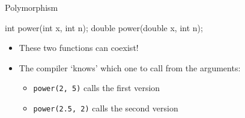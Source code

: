\begin{frame}[fragile]{Polymorphism}
    \begin{cpp}
        int power(int x, int n);
        double power(double x, int n);
    \end{cpp}
    \vspace{-1em}
    \begin{itemize}
        \item These two functions can coexist!
        \item The compiler `knows' which one to call from the arguments:
              \begin{itemize}
                  \item \texttt{power(2, 5)} calls the first version
                  \item \texttt{power(2.5, 2)} calls the second version
              \end{itemize}
    \end{itemize}
\end{frame}



